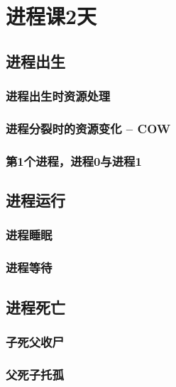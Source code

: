 

\partabstractrp{}

\part{进程课2天}

\chapter{进程出生}
\section{进程出生时资源处理}
\section{进程分裂时的资源变化 -- COW}
\section{第1个进程，进程0与进程1}

\chapter{进程运行}
\section{进程睡眠}
\section{进程等待}

\chapter{进程死亡}
\section{子死父收尸}
\section{父死子托孤}
\clearpage

